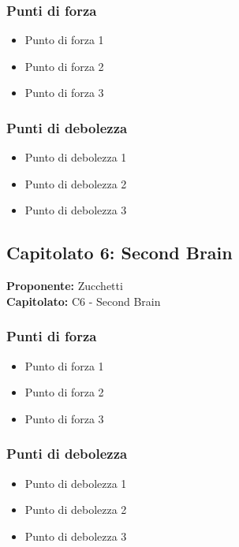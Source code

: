 \documentclass[a4paper,12pt]{article}
\begin{document}
\subsubsection{Punti di forza}
\begin{itemize}
\item Punto di forza 1
\item Punto di forza 2
\item Punto di forza 3
\end{itemize}

\subsubsection{Punti di debolezza}
\begin{itemize}
\item Punto di debolezza 1
\item Punto di debolezza 2
\item Punto di debolezza 3
\end{itemize}

\subsection{Capitolato 6: Second Brain}

\begin{tcolorbox}[colback=lightgray!30,colframe=darkgray,arc=2mm,boxrule=0.3pt]
\textbf{Proponente:} Zucchetti \\
\textbf{Capitolato:} C6 - Second Brain
\end{tcolorbox}

\subsubsection{Punti di forza}
\begin{itemize}
\item Punto di forza 1
\item Punto di forza 2
\item Punto di forza 3
\end{itemize}

\subsubsection{Punti di debolezza}
\begin{itemize}
\item Punto di debolezza 1
\item Punto di debolezza 2
\item Punto di debolezza 3
\end{itemize}
\end{document}
